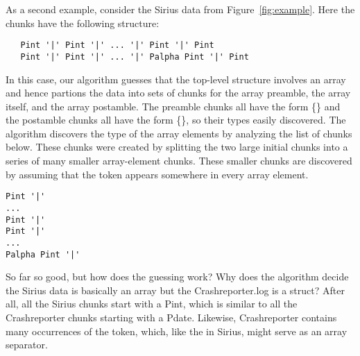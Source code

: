 
As a second example, consider the Sirius data from Figure~\ref{fig:example}.
Here the chunks have the following structure:
{\small
\begin{verbatim}
   Pint '|' Pint '|' ... '|' Pint '|' Pint
   Pint '|' Pint '|' ... '|' Palpha Pint '|' Pint
\end{verbatim}
}
\noindent
In this case, our algorithm guesses that the top-level structure involves
an array and hence partions the data into sets of chunks for the
array preamble, the array itself, and the array postamble.  The
preamble chunks all have the form \{\} and the
postamble chunks all have the form \{\}, so their 
types easily discovered.  The algorithm discovers the type of the
array elements by analyzing the list of chunks below.
These chunks were created by splitting the two
large initial chunks into a series of many smaller array-element chunks.
These smaller chunks are discovered by assuming that the  token
appears somewhere in every array element.
{\small
\begin{verbatim}
Pint '|' 
... 
Pint '|' 
Pint '|'
...
Palpha Pint '|'
\end{verbatim}
}
So far so good, but how does the guessing work?  Why does the
algorithm decide the Sirius data is basically an array but the
Crashreporter.log is a struct? After all, all the Sirius chunks start
with a Pint, which is similar to all the Crashreporter chunks starting
with a Pdate.  Likewise, Crashreporter contains many occurrences of
the  token, which, like the  in Sirius, might serve as
an array separator.

